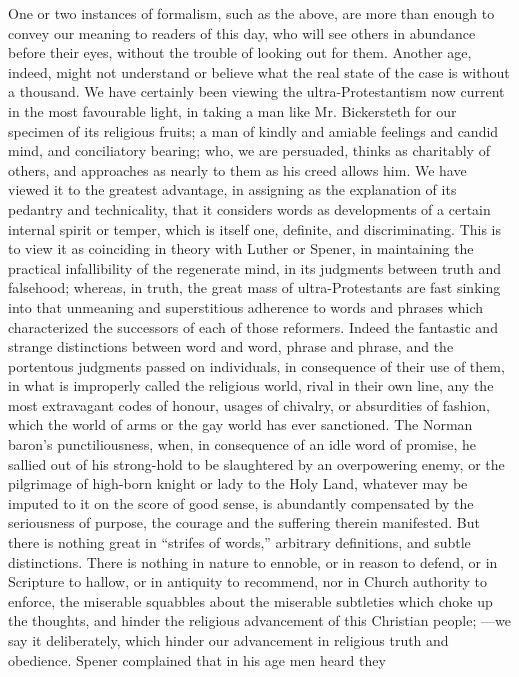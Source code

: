 One or two instances of formalism, such as the
above, are more than enough to convey our meaning to readers of this
day, who will see others in abundance before their eyes, without the
trouble of looking out for them. Another age, indeed, might not
understand or believe what the real state of the case is without a
thousand. We have certainly been viewing the ultra-Protestantism now
current in the most favourable light, in taking a man like Mr.
Bickersteth for our specimen of its religious fruits; a man of kindly
and amiable feelings and candid mind, and conciliatory bearing; who, we
are persuaded, thinks as charitably of others, and approaches as nearly
to them as his creed allows him. We have viewed it to the greatest
advantage, in assigning as the explanation of its pedantry and
technicality, that it considers words as developments of a certain
internal spirit or temper, which is itself one, definite, and
discriminating. This is to view it as coinciding in theory with Luther
or Spener, in maintaining the practical infallibility of the regenerate
mind, in its judgments between truth and falsehood; whereas, in truth,
the great mass of ultra-Protestants are fast sinking into that unmeaning
and superstitious adherence to words and phrases which characterized
the successors of each of those reformers. Indeed the fantastic
and strange distinctions between word and word, phrase and phrase, and
the portentous judgments passed on individuals, in consequence of their
use of them, in what is improperly called the religious world, rival in
their own line, any the most extravagant codes of honour, usages of
chivalry, or absurdities of fashion, which the world of arms or the gay
world has ever sanctioned. The Norman baron's punctiliousness, when, in
consequence of an idle word of promise, he sallied out of his
strong-hold to be slaughtered by an overpowering enemy, or the
pilgrimage of high-born knight or lady to the Holy Land, whatever may be
imputed to it on the score of good sense, is abundantly compensated by
the seriousness of purpose, the courage and the suffering therein
manifested. But there is nothing great in ``strifes of words,'' arbitrary
definitions, and subtle distinctions. There is nothing in nature to
ennoble, or in reason to defend, or in Scripture to hallow, or in
antiquity to recommend, nor in Church authority to enforce, the
miserable squabbles about the miserable subtleties which choke up the
thoughts, and hinder the religious advancement of this Christian people;
—we say it deliberately, which hinder our advancement in religious
truth and obedience. Spener complained that in his age men heard they

